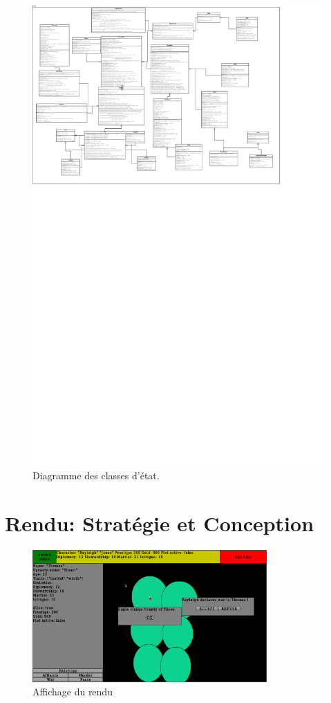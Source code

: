 \documentclass[a4paper,12pt]{article}
\begin{document}
\begin{landscape}
\begin{figure}[p]
\includegraphics[width=\paperheight]{state.pdf}
\caption{\label{uml:state}Diagramme des classes d'état.} 
\end{figure}
\end{landscape}

\clearpage
\section{Rendu: Stratégie et Conception}

\begin{figure}[htbp]
\includegraphics[width=0.8\textwidth]{render.png}
\caption{Affichage du rendu} 
\end{figure}
\end{document}
